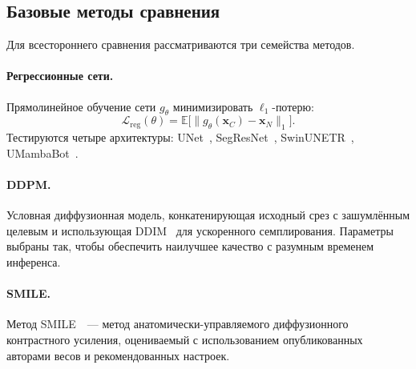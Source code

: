 \subsection{Базовые методы сравнения}
\label{sec:baselines}

Для всестороннего сравнения рассматриваются три семейства методов.

\paragraph{Регрессионные сети.} Прямолинейное обучение сети $g_\theta$ минимизировать $\ell_1$-потерю:
\[
    \mathcal{L}_{\mathrm{reg}}(\theta) = \mathbb{E}\bigl[\lVert g_\theta(\mathbf{x}_C) - \mathbf{x}_N \rVert_1\bigr].
\]
Тестируются четыре архитектуры: UNet~\cite{ronneberger2015u}, SegResNet~\cite{myronenko20183d}, SwinUNETR~\cite{hatamizadeh2021swin}, UMambaBot~\cite{ma2024u}.

\paragraph{DDPM.} Условная диффузионная модель, конкатенирующая исходный срез с зашумлённым целевым и использующая DDIM~\cite{song2020denoising} для ускоренного семплирования. Параметры выбраны так, чтобы обеспечить наилучшее качество с разумным временем инференса.

\paragraph{SMILE.} Метод SMILE~\cite{liu2025see}~--- метод анатомически-управляемого диффузионного контрастного усиления, оцениваемый с использованием опубликованных авторами весов и рекомендованных настроек.
